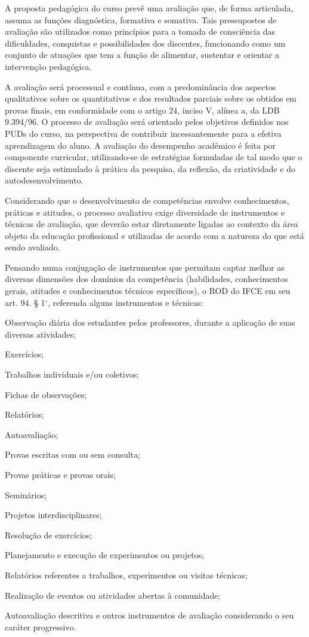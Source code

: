 \documentclass[
	12pt,				%
	openright,			%
	twoside,			%
	a4paper,			%
	chapter=TITLE,		%
	english,			%
	french,				%
	spanish,			%
	brazil,				%
	]{abntex2}
\begin{document}
A proposta pedagógica do curso prevê uma avaliação que, de forma articulada, assuma as funções diagnóstica, formativa e somativa. Tais pressupostos de avaliação são utilizados como princípios para a tomada de consciência das dificuldades, conquistas e possibilidades dos discentes, funcionando como um conjunto de atuações que tem a função de alimentar, sustentar e orientar a intervenção pedagógica.

A avaliação será processual e contínua, com a predominância dos aspectos qualitativos sobre os quantitativos e dos resultados parciais sobre os obtidos em provas finais, em conformidade com o artigo 24, inciso V, alínea a, da LDB 9.394/96. O processo de avaliação será orientado pelos objetivos definidos nos PUDs do curso, na perspectiva de contribuir incessantemente para a efetiva aprendizagem do aluno. A avaliação do desempenho acadêmico é feita por componente curricular, utilizando-se de estratégias formuladas de tal modo que o discente seja estimulado à prática da pesquisa, da reflexão, da criatividade e do autodesenvolvimento.


Considerando que o desenvolvimento de competências envolve conhecimentos, práticas e atitudes, o processo avaliativo exige diversidade de instrumentos e técnicas de avaliação, que deverão estar diretamente ligadas ao contexto da área objeto da educação profissional e utilizadas de acordo com a natureza do que está sendo avaliado.

Pensando numa conjugação de instrumentos que permitam captar melhor as diversas dimensões dos domínios da competência (habilidades, conhecimentos gerais, atitudes e conhecimentos técnicos específicos), o ROD do IFCE em seu art. 94. § 1$^\circ$, referenda alguns instrumentos e técnicas:

\begin{alineas}
\item  Observação diária dos estudantes pelos professores, durante a aplicação de suas diversas atividades;  
\item  Exercícios;
\item Trabalhos individuais e/ou coletivos;
\item Fichas de observações;
\item Relatórios;
\item Autoavaliação;
\item Provas escritas com ou sem consulta;
\item  Provas práticas e provas orais;
\item  Seminários;
\item  Projetos interdisciplinares;
\item Resolução de exercícios;
\item Planejamento e execução de experimentos ou projetos;
\item Relatórios referentes a trabalhos, experimentos ou visitas técnicas;
\item Realização de eventos ou atividades abertas à comunidade;
\item Autoavaliação descritiva e outros instrumentos de avaliação considerando o seu caráter progressivo. 

\end{alineas}
\end{document}

